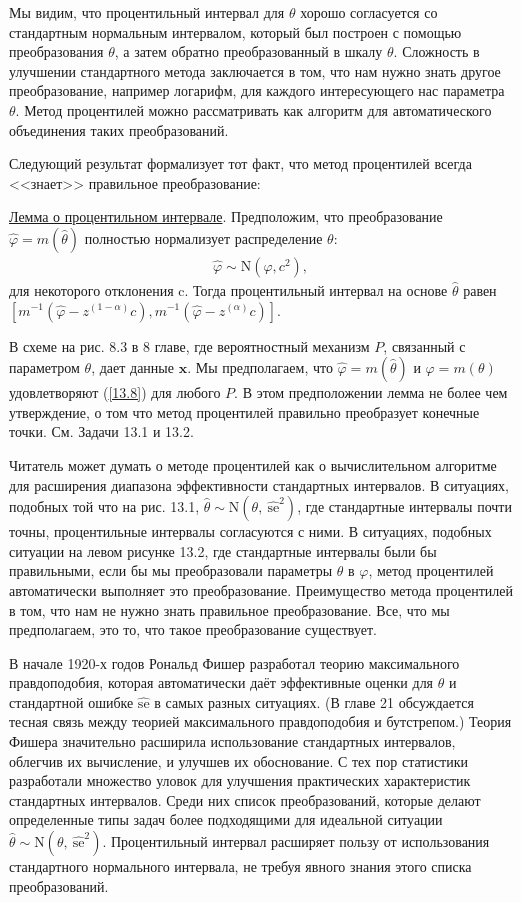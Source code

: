 Мы видим, что процентильный интервал для $\theta$ хорошо согласуется со стандартным нормальным интервалом, который был построен с помощью преобразования $\theta$, а затем обратно преобразованный в шкалу $\theta$. Сложность в улучшении стандартного метода заключается в том, что нам нужно знать другое преобразование, например логарифм, для каждого интересующего нас параметра $\theta$. Метод процентилей можно рассматривать как алгоритм для автоматического объединения таких преобразований.

Следующий результат формализует тот факт, что метод процентилей всегда <<знает>> правильное преобразование:

\underline{Лемма о процентильном интервале}. Предположим, что преобразование $\widehat{\varphi} = m(\widehat{\theta})$ полностью нормализует распределение $\theta$:
\begin{gather}\label{13.8}
\widehat{\varphi} \sim \mathrm{N}(\varphi, c^{2}),
\end{gather}
для некоторого отклонения c. Тогда процентильный интервал на основе $\widehat{\theta}$ равен $[m^{-1} (\widehat{\varphi}- z^{(1 - \alpha)}c), m^{-1} (\widehat{\varphi}- z^{(\alpha)}c)]$.

В схеме на рис. 8.3 в 8 главе, где вероятностный механизм $P$, связанный с параметром $\theta$, дает данные $\textbf{x}$. Мы предполагаем, что  $\widehat{ \varphi} = m(\widehat{\theta})$ и  $\varphi = m(\theta)$ удовлетворяют (\ref{13.8}) для любого $P$. В этом предположении лемма не более чем утверждение, о том что метод процентилей правильно преобразует конечные точки. См. Задачи 13.1 и 13.2.

Читатель может думать о методе процентилей как о вычислительном алгоритме для расширения диапазона эффективности стандартных интервалов. В ситуациях, подобных той что на рис. 13.1, $\widehat{\theta} \sim \mathrm{N}(\theta,\ \widehat{\text{se}}^{2})$, где стандартные интервалы почти точны, процентильные интервалы согласуются с ними. В ситуациях, подобных ситуации на левом рисунке 13.2, где стандартные интервалы были бы правильными, если бы мы преобразовали параметры $\theta$ в $\varphi$, метод процентилей автоматически выполняет это преобразование. Преимущество метода процентилей в том, что нам не нужно знать правильное преобразование. Все, что мы предполагаем, это то, что такое преобразование существует.

В начале 1920-х годов Рональд Фишер разработал теорию максимального правдоподобия, которая автоматически даёт эффективные оценки для $\widehat{\theta}$ и стандартной ошибке $\widehat{\text{se}}$ в самых разных ситуациях. (В главе 21 обсуждается тесная связь между теорией максимального правдоподобия и бутстрепом.) Теория Фишера значительно расширила использование стандартных интервалов, облегчив их вычисление, и улучшев их обоснование. С тех пор статистики разработали множество уловок для улучшения практических характеристик стандартных интервалов. Среди них список преобразований, которые делают определенные типы задач более подходящими для идеальной ситуации  $\widehat{\theta} \sim \mathrm{N}(\theta, \ \widehat{\text{se}}^{2})$. Процентильный интервал расширяет пользу от использования стандартного нормального интервала, не требуя явного знания этого списка преобразований.